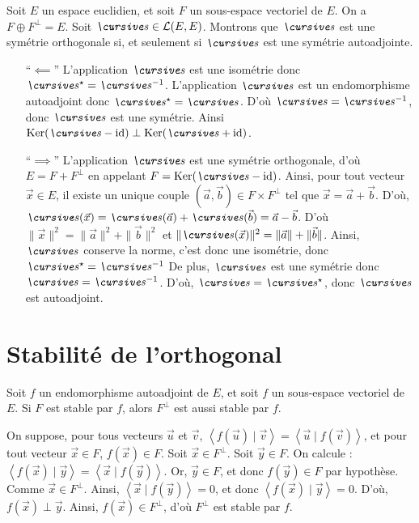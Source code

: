\begin{exo}
	Soit $E$ un espace euclidien, et soit $F$ un sous-espace vectoriel de $E$. On a $F \oplus F^\perp = E$. Soit $\s \in \mathcal{L}(E, E)$.
	Montrons que $\s$ est une symétrie orthogonale si, et seulement si $\s$ est une symétrie autoadjointe.
	\begin{itemize}
		\item [``$\impliedby$''] L'application $\s$ est une isométrie donc $\s^\star = \s^{-1}$. L'application $\s$ est un endomorphisme autoadjoint donc $\s^\star = \s$.
			D'où $\s = \s^{-1}$, donc $\s$ est une symétrie.
			Ainsi $\Ker(\s - \id) \perp \Ker(\s + \id)$.
		\item[``$\implies$''] L'application $\s$ est une symétrie orthogonale, d'où $E = F + F^\perp$ en appelant $F = \Ker(\s - \id)$.
			Ainsi, pour tout vecteur $\vec{x} \in E$, il existe un unique couple $(\vec{a}, \vec{b}) \in F \times F^\perp$ tel que $\vec{x} = \vec{a} + \vec{b}$.
			D'où, $\s(\vec{x}) = \s(\vec{a}) + \s(\vec{b}) = \vec{a} - \vec{b}$.
			D'où $\|\vec{x}\|^2 = \|\vec{a}\|^2 + \|\vec{b}\|^2$ et $\|\s(\vec{x})\|^2 = \|\vec{a}\| + \|\vec{b}\|$. Ainsi, $\s$ conserve la norme, c'est donc une isométrie, donc $\s^\star  = \s^{-1}$
			De plus, $\s$ est une symétrie donc $\s = \s^{-1}$. D'où, $\s = \s^\star$, donc $\s$ est autoadjoint.
	\end{itemize}
\end{exo}

\section{Stabilité de l'orthogonal}

\begin{prop}
	Soit $f$\/ un endomorphisme autoadjoint de $E$, et soit $f$\/ un sous-espace vectoriel de $E$. Si $F$\/ est stable par $f$, alors $F^\perp$\/ est aussi stable par $f$.
\end{prop}

\begin{prv}
	On suppose, pour tous vecteurs $\vec{u}$\/ et $\vec{v}$, $\left<f(\vec{u}) \mid \vec{v} \right> = \left<\vec{u}  \mid f(\vec{v}) \right>$, et pour tout vecteur $\vec{x} \in F$, $f(\vec{x}) \in F$.
	Soit $\vec{x} \in F^\perp$.
	Soit $\vec{y} \in F$.
	On calcule : $\left< f(\vec{x})  \mid \vec{y} \right> = \left<\vec{x}  \mid f(\vec{y}) \right>$.
	Or, $\vec{y} \in F$, et donc $f(\vec{y}) \in F$\/ par hypothèse.
	Comme $\vec{x} \in F^\perp$. Ainsi, $\left<\vec{x}  \mid f(\vec{y}) \right> = 0$, et donc $\left<f(\vec{x})  \mid \vec{y} \right> = 0$.
	D'où, $f(\vec{x}) \perp \vec{y}$.
	Ainsi, $f(\vec{x}) \in F^\perp$, d'où $F^\perp$\/ est stable par $f$.
\end{prv}

